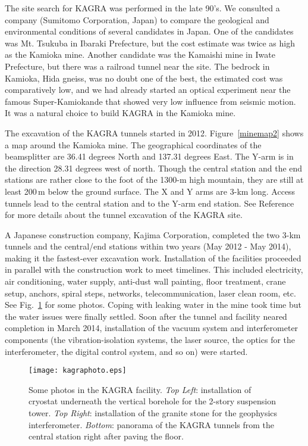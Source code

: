 \documentclass[prd ,twocolumn ,secnumarabic,dvips
,amssymb, amsmath,nobibnotes, aps, prd,superscriptaddress]{revtex4-1}
\begin{document}
{The site search for KAGRA was performed in the late 90's. We consulted a company (Sumitomo Corporation, Japan) to compare the geological and environmental conditions of several candidates in Japan. One of the candidates was Mt. Tsukuba in Ibaraki Prefecture, but the cost estimate was twice as high as the Kamioka mine. Another candidate was the Kamaishi mine in Iwate Prefecture, but there was a railroad tunnel near the site. The bedrock in Kamioka, Hida gneiss, was no doubt one of the best, the estimated cost was comparatively low, and we had already started an optical experiment near the famous Super-Kamiokande that showed very low influence from seismic motion. It was a natural choice to build KAGRA in the Kamioka mine.

The excavation of the KAGRA tunnels started in 2012. Figure~\ref{minemap2} shows a map around the Kamioka mine. The geographical coordinates of the beamsplitter are 36.41 degrees North and 137.31 degrees East. The Y-arm is in the direction 28.31 degrees west of north. Though the central station and the end stations are rather close to the foot of the 1300-m high mountain, they are still at least 200\,m below the ground surface. The X and Y arms are 3-km long. Access tunnels lead to the central station and to the Y-arm end station. See Reference~\cite{UchiyamaCQG} for more details about the tunnel excavation of the KAGRA site.

A Japanese construction company, Kajima Corporation, completed the two 3-km tunnels and the central/end stations within two years (May 2012 - May 2014), making it the fastest-ever excavation work. 
Installation of the facilities proceeded in parallel with the construction work to meet timelines. This included electricity, air conditioning, water supply, anti-dust wall painting, floor treatment, crane setup, anchors, spiral steps, networks, telecommunication, laser clean room, etc. See Fig.~\ref{fig:photo1} for some photos. Coping with leaking water in the mine took time but the water issues were finally settled.
Soon after the tunnel and facility neared completion in March 2014, installation of the vacuum system and interferometer components (the vibration-isolation systems, the laser source, the optics for the interferometer, the digital control system, and so on) were started. 
\begin{figure}[t]
  \begin{center}
   \texttt{[image: kagraphoto.eps]}
  \end{center}
\caption{\label{fig:photo1}Some photos in the KAGRA facility. {\it Top Left}: installation of cryostat underneath the vertical borehole for the 2-story suspension tower. {\it Top Right}: installation of the granite stone for the geophysics interferometer. {\it Bottom}: panorama of the KAGRA tunnels from the central station right after paving the floor.}
\end{figure}

}
\end{document}
